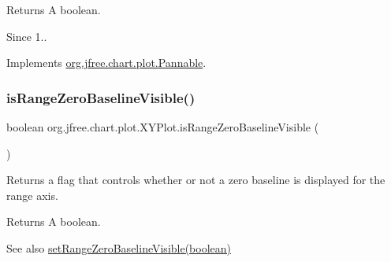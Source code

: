 \begin{DoxyReturn}{Returns}
A boolean.
\end{DoxyReturn}
\begin{DoxySince}{Since}
1.. 
\end{DoxySince}


Implements \mbox{\hyperlink{interfaceorg_1_1jfree_1_1chart_1_1plot_1_1_pannable_ad1e4f1dde36baf9964ac14654aab4f8e}{org.\+jfree.\+chart.\+plot.\+Pannable}}.

\mbox{\label{classorg_1_1jfree_1_1chart_1_1plot_1_1_x_y_plot_a9823b60560beb39d4a8a786d5e44bea0}} 
\subsubsection{\texorpdfstring{is\+Range\+Zero\+Baseline\+Visible()}{isRangeZeroBaselineVisible()}}
{\footnotesize\ttfamily boolean org.\+jfree.\+chart.\+plot.\+X\+Y\+Plot.\+is\+Range\+Zero\+Baseline\+Visible (\begin{DoxyParamCaption}{ }\end{DoxyParamCaption})}

Returns a flag that controls whether or not a zero baseline is displayed for the range axis.

\begin{DoxyReturn}{Returns}
A boolean.
\end{DoxyReturn}
\begin{DoxySeeAlso}{See also}
\mbox{\hyperlink{classorg_1_1jfree_1_1chart_1_1plot_1_1_x_y_plot_a51560b2df5cce8d8565595c9f74981bb}{set\+Range\+Zero\+Baseline\+Visible(boolean)}} 
\end{DoxySeeAlso}
\mbox{\label{classorg_1_1jfree_1_1chart_1_1plot_1_1_x_y_plot_a730a3fdcafdb45f7d21112631dec8d28}} 
